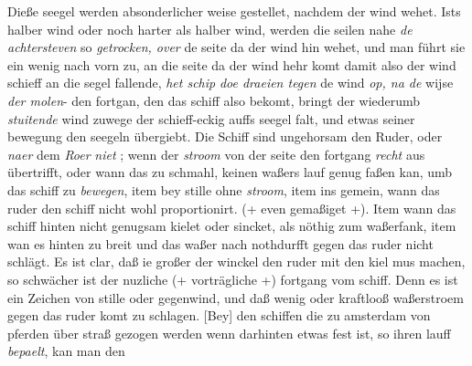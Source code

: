 Dieße seegel\protect{} werden absonderlicher weise gestellet, nachdem der wind wehet. Ists halber wind oder noch harter als halber wind, werden die seilen\protect{} nahe \textit{de achtersteven}\protect{} so \textit{getrocken, over} de seite da der wind hin wehet, und man f\"{u}hrt sie ein wenig nach vorn zu, an die seite da der wind hehr komt damit also der wind schieff an die segel\protect{} fallende, \textit{het schip}\protect{} \textit{doe draeien tegen} de wind \textit{op, na de} wijse \textit{der molen}- den fortgan\protect{}, den das schiff\protect{} also bekomt, bringt der wiederumb \textit{stuitende} wind zuwege der schieff-eckig auffs seegel\protect{} falt, und etwas seiner bewegung den seegeln\protect{} \"{u}bergiebt. Die Schiff\protect{} sind ungehorsam den Ruder\protect{}, oder  \textit{naer} dem \textit{Roer}\protect{} \textit{niet} ; wenn der \textit{stroom} von der seite den fortgang\protect{} \textit{recht} aus \"{u}bertrifft, oder wann das  zu schmahl, keinen waßers lauf genug faßen kan, umb das schiff\protect{} zu \textit{bewegen}, item bey stille ohne \textit{stroom}, item ins gemein, wann das ruder\protect{} den schiff\protect{} nicht wohl proportionirt. (+ even gemaßiget +). Item wann das schiff\protect{} hinten nicht genugsam kielet oder sincket, als n\"{o}thig zum waßerfank, item wan es hinten zu breit und das waßer nach nothdurfft gegen das ruder\protect{} nicht schl\"{a}gt. Es ist clar, daß ie großer der winckel den  ruder\protect{} mit den kiel\protect{} mus machen, so schw\"{a}cher ist der nuzliche (+ vortr\"{a}gliche +) fortgang vom schiff\protect{}. Denn es ist ein Zeichen von stille oder gegenwind, und daß wenig oder kraftlooß waßerstroem gegen das ruder\protect{} komt zu schlagen. [Bey] den schiffen\protect{} die zu amsterdam\protect{} von pferden \"{u}ber straß gezogen werden wenn darhinten etwas fest ist, so ihren lauff \textit{bepaelt}, kan man den 
